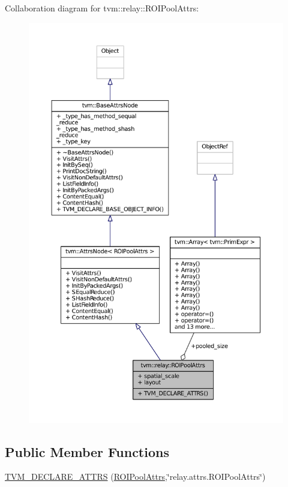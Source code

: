 Collaboration diagram for tvm\+:\+:relay\+:\+:R\+O\+I\+Pool\+Attrs\+:
\nopagebreak
\begin{figure}[H]
\begin{center}
\leavevmode
\includegraphics[width=350pt]{structtvm_1_1relay_1_1ROIPoolAttrs__coll__graph}
\end{center}
\end{figure}
\subsection*{Public Member Functions}
\begin{DoxyCompactItemize}
\item 
\hyperlink{structtvm_1_1relay_1_1ROIPoolAttrs_a06d3037a6dd772136cb2cbb9a954242f}{T\+V\+M\+\_\+\+D\+E\+C\+L\+A\+R\+E\+\_\+\+A\+T\+T\+RS} (\hyperlink{structtvm_1_1relay_1_1ROIPoolAttrs}{R\+O\+I\+Pool\+Attrs},\char`\"{}relay.\+attrs.\+R\+O\+I\+Pool\+Attrs\char`\"{})
\end{DoxyCompactItemize}
